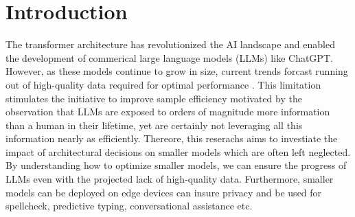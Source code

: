 
\section{Introduction} %
\label{sec:introduction}



The transformer architecture \cite{Vaswani2017} has revolutionized the AI landscape and enabled the development of commerical large language models (LLMs) like ChatGPT. However, as these models continue to grow in size, current trends forcast running out of high-quality data required for optimal performance \cite{Villalobos2022}. This limitation stimulates the initiative to improve sample efficiency motivated by the observation that LLMs are exposed to orders of magnitude more information than a human in their lifetime, yet are certainly not leveraging all this information nearly as efficiently. Thereore, this reserachs aims to investiate the impact of architectural decisions on smaller models which are often left neglected. By understanding how to optimize smaller models, we can ensure the progress of LLMs even with the projected lack of high-quality data. Furthermore, smaller models can be deployed on edge devices can insure privacy and be used for spellcheck, predictive typing, conversational assistance etc.

